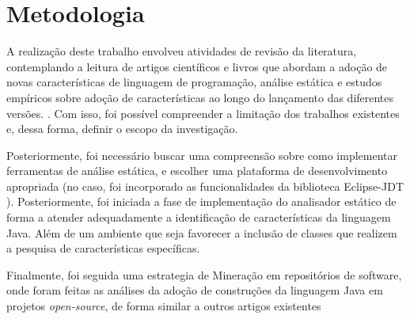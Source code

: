 %


\section{Metodologia}
    
    A realização deste trabalho envolveu atividades de revisão da literatura, contemplando a leitura de artigos científicos e livros que abordam a adoção de novas características de linguagem de programação, análise estática e estudos empíricos sobre adoção de características ao longo do lançamento das diferentes versões. \cite{Schaefer:ACM2009,Parnin:ACM2011,Overbey:2009,bonifacio:scam2015}. Com isso, foi possível compreender a limitação dos trabalhos existentes e, dessa forma, definir o escopo da investigação. 
    
    Posteriormente, foi necessário buscar uma compreensão sobre como implementar ferramentas de 
    análise estática, e escolher uma plataforma de desenvolvimento apropriada (no caso, foi incorporado as funcionalidades da biblioteca Eclipse-JDT \cite{EclipseJDT}). Posteriormente, foi iniciada a fase de implementação do analisador estático de forma a atender adequadamente a identificação de características da linguagem Java. Além de um ambiente que seja favorecer a inclusão de classes que realizem a pesquisa de características específicas.   
     
    Finalmente, foi seguida uma estrategia de Mineração em repositórios de software, onde foram feitas as análises da adoção de construções da linguagem Java em projetos \textit{open-source}, de forma similar a outros artigos existentes~\cite{pinto-jss:2015,Schaefer:ACM2009, Schaefer:ACM2010, Overbey:2009}
     
